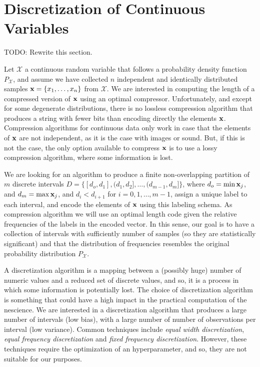 %
%

\section{Discretization of Continuous Variables}
\label{sec:discretization_algorithms}

{\color{red} TODO: Rewrite this section.}

Let $\mathcal{X}$ a continuous random variable that follows a probability density function $P_\mathcal{X}$, and assume we have collected $n$ independent and identically distributed samples $\bold{x} = \{x_1, \ldots, x_n\}$ from $\mathcal{X}$. We are interested in computing the length of a compressed version of $\bold{x}$ using an optimal compressor. Unfortunately, and except for some degenerate distributions, there is no lossless compression algorithm that produces a string with fewer bits than encoding directly the elements $\bold{x}$. Compression algorithms for continuous data only work in case that the elements of $\bold{x}$ are not independent, as it is the case with images or sound. But, if this is not the case, the only option available to compress $\bold{x}$ is to use a lossy compression algorithm, where some information is lost.

We are looking for an algorithm to produce a finite non-overlapping partition of $m$ discrete intervals $D=\{ [d_o, d_1], (d_1, d_2], \ldots, (d_{m-1}, d_m] \}$, where $d_o = \min{\bold{x}_j}$, and $d_m = \max{\bold{x}_j}$, and $d_i < d_{i+1}$ for $i = 0, 1, \ldots, m-1$, assign a unique label to each interval, and encode the elements of $\bold{x}$ using this labeling schema. As compression algorithm we will use an optimal length code given the relative frequencies of the labels in the encoded vector. In this sense, our goal is to have a collection of intervals with sufficiently number of samples (so they are statistically significant) and that the distribution of frequencies resembles the original probability distribution $P_\mathcal{X}$.

A discretization algorithm is a mapping between a (possibly huge) number of numeric values and a reduced set of discrete values, and so, it is a process in which some information is potentially lost. The choice of discretization algorithm is something that could have a high impact in the practical computation of the nescience. We are interested in a discretization algorithm that produces a large number of intervals (low bias), with a large number of number of observations per interval (low variance). Common techniques include \emph{equal width discretization}, \emph{equal frequency discretization} and \emph{fixed frequency discretization}. However, these techniques require the optimization of an hyperparameter, and so, they are not suitable for our purposes.

